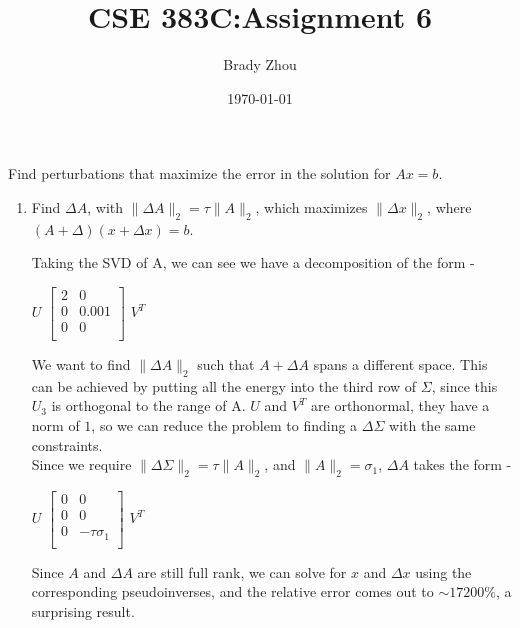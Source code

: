 \documentclass[12pt]{article}
\title{\textbf{CSE 383C:\@ Assignment 6}}
\author{Brady Zhou}
\date{\today}
\newenvironment{exercise}[2][Exercise]{\begin{trivlist}
\item[\hskip \labelsep{\bfseries #1}\hskip \labelsep{\bfseries #2.}]}{\end{trivlist}}
\begin{document}
\maketitle

\begin{exercise}{1} Find perturbations that maximize the error in the
  solution for $Ax = b$.

  \begin{enumerate}[label=(\alph*)]

    \item Find $\Delta A$, with $\|\Delta A\|_2 = \tau \|A\|_2$,
      which maximizes $\|\Delta x \|_2$, where $(A + \Delta)(x + \Delta x) = b$.

      Taking the SVD of A, we can see we have a decomposition of the form -

      \begin{center}
        {\Large $U$}
        $\begin{bmatrix}
          2 & 0 \\
          0 & 0.001 \\
          0 & 0 \\
        \end{bmatrix}$
        {\Large $V^T$}
      \end{center}

      We want to find $\|\Delta A\|_2$ such that $A + \Delta A$ spans a different
      space.
      This can be achieved by putting all the energy into the third row of $\Sigma$,
      since this $U_3$ is orthogonal to the range of A.
      $U$ and $V^T$ are orthonormal, they have a norm of $1$, so we can
      reduce the problem to finding a $\Delta \Sigma$ with the same constraints. \\
      Since we require $\|\Delta \Sigma\|_2 = \tau \|A\|_2$,
      and $\|A\|_2 = \sigma_1$, $\Delta A$ takes the form -

      \begin{center}
        {\Large $U$}
        $\begin{bmatrix}
          0 & 0 \\
          0 & 0 \\
          0 & -\tau \sigma_1 \\
        \end{bmatrix}$
        {\Large $V^T$}
      \end{center}

      Since $A$ and $\Delta A$ are still full rank, we can solve for
      $x$ and $\Delta x$ using the corresponding pseudoinverses, and the
      relative error comes out to $\sim17200\%$, a surprising result.


\end{enumerate}
\end{exercise}
\end{document}
